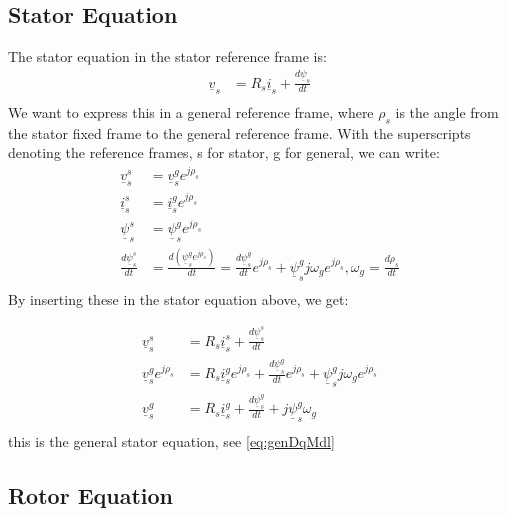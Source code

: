\documentclass[]{book}
\begin{document}
\hypertarget{stator-equation}{%
\subsection{Stator Equation}\label{stator-equation}}

The stator equation in the stator reference frame is:
\[
\begin{aligned}
\underline{v}_s & = R_s \underline{i}_s + \frac{d\underline{\psi}_s}{dt}  \\
\end{aligned}
\label{eq:statorVoltStat}
\]
We want to express this in a general reference frame, where \(\rho_s\) is the angle from the stator fixed frame to the general reference frame. With the superscripts denoting the reference frames, s for stator, g for general, we can write:
\[
\begin{aligned}
\underline{v}^s_s & = \underline{v}^g_s e^{j\rho_s} \\
\underline{i}^s_s & = \underline{i}^g_s e^{j\rho_s} \\
\underline{\psi}^s_s & = \underline{\psi}^g_s e^{j\rho_s} \\
\frac{d\underline{\psi}^s_s}{dt}  & = \frac{d (\underline{\psi}^g_s e^{j\rho_s} )}{dt}  = 
\frac{d\underline{\psi}^g_s}{dt}  e^{j\rho_s} + \underline{\psi}^g_s j \omega_g e^{j\rho_s},
\omega_g = \frac{d\rho_s}{dt} \\
\end{aligned}
\label{eq:statorVoltStat1}
\]
By inserting these in the stator equation above, we get:

\[
\begin{aligned}
\underline{v}^s_s & = R_s \underline{i}^s_s + \frac{d\underline{\psi}^s_s}{dt}  \\
\underline{v}^g_s e^{j\rho_s} & = R_s \underline{i}^g_s e^{j\rho_s} + \frac{d\underline{\psi}^g_s}{dt}  e^{j\rho_s} + \underline{\psi}^g_s j \omega_g e^{j\rho_s}  \\
\underline{v}^g_s  & = R_s \underline{i}^g_s  + \frac{d\underline{\psi}^g_s}{dt}   + j\underline{\psi}^g_s  \omega_g   \\
\end{aligned}
\label{eq:statorVoltStat2}
\]
this is the general stator equation, see \eqref{eq:genDqMdl}

\hypertarget{rotor-equation}{%
\subsection{Rotor Equation}\label{rotor-equation}}
\end{document}
